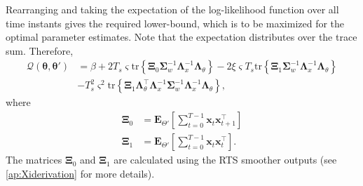 \documentclass[review,authoryear,3p]{elsarticle}
\begin{document}
Rearranging and taking the expectation of the log-likelihood function over all time instants gives the required lower-bound, which is to be maximized for the optimal parameter estimates. Note that the expectation distributes over the trace sum. Therefore, 
\begin{align}\label{eq:MRA-QintermsofTraces}
\mathcal Q(\boldsymbol \theta, \boldsymbol\theta')&=\beta+2 T_s\varsigma\mathrm{tr} \left\lbrace \boldsymbol \Xi_0\boldsymbol\Sigma_w^{-1}\boldsymbol\Lambda_x^{-1}\boldsymbol\Lambda_{\theta}\right\rbrace-2\xi\varsigma T_s\mathrm{tr} \left\lbrace \boldsymbol\Xi_1\boldsymbol\Sigma_w^{-1}\boldsymbol\Lambda_x^{-1}\boldsymbol\Lambda_{\theta}\right\rbrace \nonumber \\
&-T_s^2\varsigma^2\mathrm{tr} \left\lbrace \boldsymbol\Xi_1 \boldsymbol\Lambda_{\theta}^\top\boldsymbol\Lambda_x^{-1}\boldsymbol\Sigma_w^{-1}\boldsymbol\Lambda_x^{-1}\boldsymbol\Lambda_{\theta}\right\rbrace,
\end{align}
where
\begin{align}
\boldsymbol\Xi_0&=\mathbf E_{\Theta'}\left[\sum_{t=0}^{T-1}\mathbf x_t\mathbf x_{t+1}^\top\right] \label{eq:app-Xi0}\\
\boldsymbol\Xi_1&=\mathbf E_{\Theta'}\left[\sum_{t=0}^{T-1}\mathbf x_t\mathbf x_{t}^\top\right] \label{eq:app-Xi1}.
\end{align}
The matrices $\boldsymbol\Xi_0$ and $\boldsymbol\Xi_1$ are calculated using the RTS smoother outputs (see \ref{ap:Xiderivation} for more details).
\end{document}
